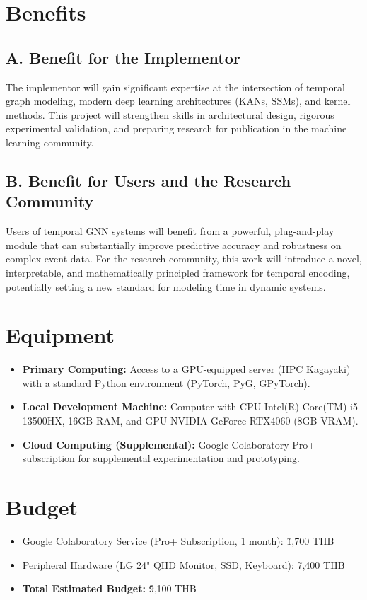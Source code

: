 \documentclass{article}
\begin{document}
\section*{Benefits}
\subsection*{A. Benefit for the Implementor}
The implementor will gain significant expertise at the intersection of temporal graph modeling, modern deep learning architectures (KANs, SSMs), and kernel methods. This project will strengthen skills in architectural design, rigorous experimental validation, and preparing research for publication in the machine learning community.

\subsection*{B. Benefit for Users and the Research Community}
Users of temporal GNN systems will benefit from a powerful, plug-and-play module that can substantially improve predictive accuracy and robustness on complex event data. For the research community, this work will introduce a novel, interpretable, and mathematically principled framework for temporal encoding, potentially setting a new standard for modeling time in dynamic systems.

\section*{Equipment}
\begin{itemize}
    \item \textbf{Primary Computing:} Access to a GPU-equipped server (HPC Kagayaki) with a standard Python environment (PyTorch, PyG, GPyTorch).
    \item \textbf{Local Development Machine:} Computer with CPU Intel(R) Core(TM) i5-13500HX, 16GB RAM, and GPU NVIDIA GeForce RTX4060 (8GB VRAM).
    \item \textbf{Cloud Computing (Supplemental):} Google Colaboratory Pro+ subscription for supplemental experimentation and prototyping.
\end{itemize}

\section*{Budget}
\begin{itemize}
    \item Google Colaboratory Service (Pro+ Subscription, 1 month): \~1,700 THB
    \item Peripheral Hardware (LG 24" QHD Monitor, SSD, Keyboard): \~7,400 THB
    \item \textbf{Total Estimated Budget:} \~9,100 THB
\end{itemize}
\end{document}
